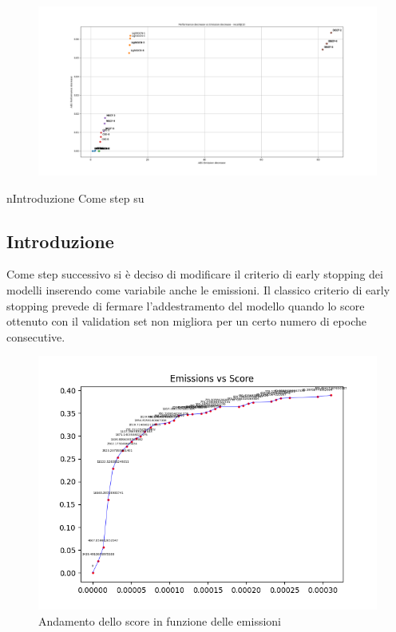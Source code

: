 \begin{figure}[H]
    \centering
     \includegraphics[width=\textwidth]{images/sensibility_recall@10.png}
\end{figure}n{Introduzione}
Come step su\subsection{Introduzione}
Come step successivo si è deciso di modificare il criterio di early stopping dei modelli inserendo come variabile anche le emissioni.
Il classico criterio di early stopping prevede di fermare l'addestramento del modello quando lo score ottenuto con il validation set non migliora per un certo numero di epoche consecutive.


\begin{figure}[H]
    \centering
     \includegraphics[width=\textwidth]{images/curve_emissions_score.png}
    \caption{Andamento dello score in funzione delle emissioni}
\end{figure}

